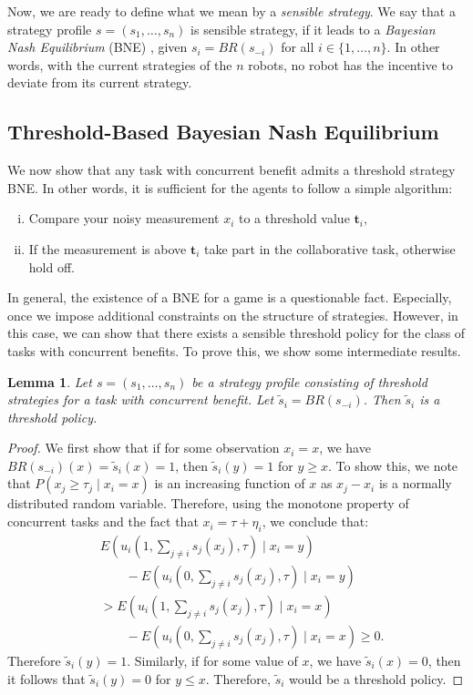 \documentclass[conference]{ieeeconf}
\newtheorem{lemma}{Lemma}
\def\td{\mathbf{t}}   %
\begin{document}
Now, we are ready to define what we mean by a \emph{sensible strategy}. We say that a strategy profile $s=(s_1,\ldots,s_n)$ is sensible strategy, if it leads to a \emph{Bayesian Nash Equilibrium} (BNE) \cite{fudenberg1998theory}, given $s_i=BR(s_{-i})$ for all $i\in \{1,\ldots,n\}$. In other words, with the current strategies of the $n$ robots, no robot has the incentive to deviate from its current strategy.

\subsection{Threshold-Based Bayesian Nash Equilibrium}\label{subsec:thmproof}
We now show that any task with concurrent benefit admits a threshold strategy BNE. In other words, it is sufficient for the agents to follow a simple algorithm: 
\begin{enumerate}[(i)]
\item Compare your noisy measurement $x_i$ to a threshold value $\td_i$,
\item If the measurement is above $\td_i$ take part in the collaborative task, otherwise hold off. 
\end{enumerate}

In general, the existence of a BNE for a game is a questionable fact. Especially, once we impose additional constraints on the structure of strategies. However, in this case, we can show that there exists a sensible threshold policy for the class of tasks with concurrent benefits. To prove this, we show some intermediate results. 
\begin{lemma}\label{lemma:thresholdBR}
Let $s=(s_1,\ldots,s_n)$ be a strategy profile consisting of threshold strategies for a task with concurrent benefit. Let $\tilde{s}_i=BR(s_{-i})$. Then $\tilde{s}_i$ is a threshold policy. 
\end{lemma}
\begin{proof}
We first show that if for some observation $x_i=x$, we have $BR(s_{-i})(x)=\tilde{s}_i(x)=1$, then $\tilde{s}_i(y)=1$ for $y\geq x$. To show this,  we note that $P(x_j\geq \tau_j\mid x_i=x)$ is an increasing function of $x$ as $x_j-x_i$ is a normally distributed random variable. Therefore, using the monotone property of concurrent tasks and the fact that $x_i=\tau+\eta_i$, we conclude that:
\vspace{-5px}
\begin{align*}
&E(u_i(1,\sum_{j\not=i}s_j(x_j),\tau)\mid x_i=y)\\ 
&\qquad-E(u_i(0,\sum_{j\not=i}s_j(x_j),\tau)\mid x_i=y)\\ 
&>E(u_i(1,\sum_{j\not=i}s_j(x_j),\tau)\mid x_i=x)\\
&\qquad-E(u_i(0,\sum_{j\not=i}s_j(x_j),\tau)\mid x_i=x)\geq 0.
\end{align*}
Therefore $\tilde{s}_i(y)=1$. Similarly, if for some value of $x$, we have $\tilde{s}_i(x)=0$, then it follows that $\tilde{s}_i(y)=0$ for $y\leq x$. Therefore, $\tilde{s}_i$ would be a threshold policy.  
\end{proof}
\end{document}
